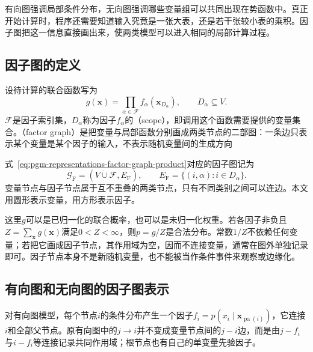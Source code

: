 有向图强调局部条件分布，无向图强调哪些变量组可以共同出现在势函数中。真正开始计算时，程序还需要知道输入究竟是一张大表，还是若干张较小表的乘积。因子图把这一信息直接画出来，使两类模型可以进入相同的局部计算过程。

\subsection{因子图的定义}
\label{sec:pgm-representations-factor-graph-definition}

设待计算的联合函数写为
\begin{equation}
  g(\bm{x})=\prod_{\alpha\in\mathcal{F}}
  f_\alpha(\bm{x}_{D_\alpha}),
  \qquad D_\alpha\subseteq V.
  \label{eq:pgm-representations-factor-graph-product}
\end{equation}
$\mathcal{F}$是因子索引集，$D_\alpha$称为因子$f_\alpha$的（scope），即调用这个函数需要提供的变量集合。（factor graph）是把变量与局部函数分别画成两类节点的二部图：一条边只表示某个变量是某个因子的输入，不表示随机变量间的生成方向

\begin{definition}[因子图]
  \label{def:pgm-representations-factor-graph}
  式~\eqref{eq:pgm-representations-factor-graph-product}对应的因子图记为
  \[
    \mathcal{G}_{\mathrm F}
    =(V\mathbin{\dot\cup}\mathcal{F},E_{\mathrm F}),
    \qquad
    E_{\mathrm F}=\{(i,\alpha):i\in D_\alpha\}.
  \]
  变量节点与因子节点属于互不重叠的两类节点，只有不同类别之间可以连边。本文用圆形表示变量，用方形表示因子。
\end{definition}

这里$g$可以是已归一化的联合概率，也可以是未归一化权重。若各因子非负且$Z=\sum_{\bm{x}}g(\bm{x})$满足$0<Z<\infty$，则$p=g/Z$是合法分布。常数$1/Z$不依赖任何变量；若把它画成因子节点，其作用域为空，因而不连接变量，通常在图外单独记录即可。因子节点本身不是新随机变量，也不能被当作条件事件来观察或边缘化。

\subsection{有向图和无向图的因子图表示}
\label{sec:pgm-representations-two-factor-graphs}

对有向图模型，每个节点$i$的条件分布产生一个因子$f_i=p(x_i\mid\bm{x}_{\operatorname{pa}(i)})$，它连接$i$和全部父节点。原有向图中的$j\to i$并不变成变量节点间的$j-i$边，而是由$j-f_i$与$i-f_i$等连接记录共同作用域；根节点也有自己的单变量先验因子。

